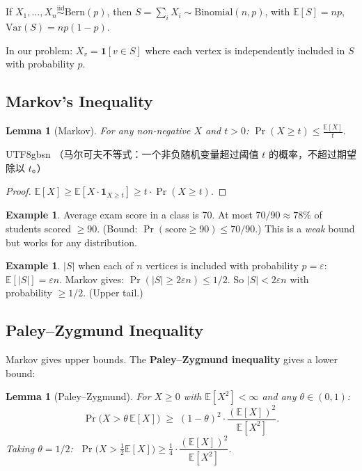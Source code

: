 \documentclass[12pt]{article}
\newtheorem{lemma}[theorem]{Lemma}
\theoremstyle{definition}
\newtheorem{example}[theorem]{Example}
\theoremstyle{remark}
\begin{document}
If $X_1,\ldots,X_n \overset{\mathrm{iid}}{\sim} \mathrm{Bern}(p)$, then $S = \sum_i X_i \sim
\mathrm{Binomial}(n,p)$, with $\mathbb{E}[S] = np$, $\mathrm{Var}(S) = np(1-p)$.

In our problem: $X_v = \mathbf{1}[v \in S]$ where each vertex is independently
included in $S$ with probability $p$.

\subsection{Markov's Inequality}

\begin{lemma}[Markov]
For any non-negative $X$ and $t > 0$:
$\displaystyle\Pr(X \ge t) \le \frac{\mathbb{E}[X]}{t}.$
\end{lemma}

\begin{CJK}{UTF8}{gbsn}
（马尔可夫不等式：一个非负随机变量超过阈值 $t$ 的概率，不超过期望除以 $t$。）
\end{CJK}

\begin{proof}
$\mathbb{E}[X] \ge \mathbb{E}[X \cdot \mathbf{1}_{X \ge t}] \ge t \cdot \Pr(X \ge t)$.
\end{proof}

\begin{example}
Average exam score in a class is 70.  At most $70/90 \approx 78\%$ of students scored $\ge 90$.
(Bound: $\Pr(\text{score} \ge 90) \le 70/90$.)
This is a \emph{weak} bound but works for any distribution.
\end{example}

\begin{example}
$|S|$ when each of $n$ vertices is included with probability $p = \varepsilon$:
$\mathbb{E}[|S|] = \varepsilon n$.  Markov gives: $\Pr(|S| \ge 2\varepsilon n) \le 1/2$.
So $|S| < 2\varepsilon n$ with probability $\ge 1/2$.  (Upper tail.)
\end{example}

\subsection{Paley--Zygmund Inequality}

Markov gives upper bounds.  The \textbf{Paley--Zygmund inequality} gives a lower bound:

\begin{lemma}[Paley--Zygmund]\label{lem:pz}
For $X \ge 0$ with $\mathbb{E}[X^2] < \infty$ and any $\theta \in (0,1)$:
\[
  \Pr\!\bigl(X > \theta\,\mathbb{E}[X]\bigr)
  \;\ge\; (1-\theta)^2 \cdot \frac{(\mathbb{E}[X])^2}{\mathbb{E}[X^2]}.
\]
Taking $\theta = 1/2$: $\;\Pr\!\bigl(X > \tfrac{1}{2}\mathbb{E}[X]\bigr) \ge
\tfrac{1}{4} \cdot \dfrac{(\mathbb{E}[X])^2}{\mathbb{E}[X^2]}$.
\end{lemma}
\end{document}
